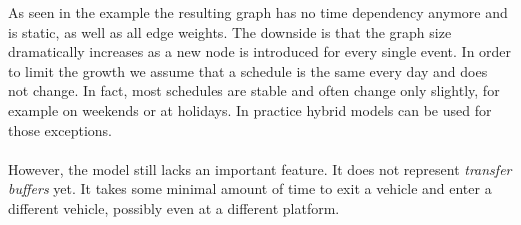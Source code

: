 	As seen in the example the resulting graph has no time dependency anymore and is static, as well as all edge weights.
	The downside is that the graph size dramatically increases as a new node is introduced for every single event.
	In order to limit the growth we assume that a schedule is the same every day and does not change. In fact, most schedules are
	stable and often change only slightly, for example on weekends or at holidays. In practice hybrid models can be used for
	those exceptions.\\\\
	However, the model still lacks an important feature. It does not represent \textit{transfer buffers}  yet.
	It takes some minimal amount of time to exit a vehicle and enter a different vehicle, possibly even at a different platform.
	
